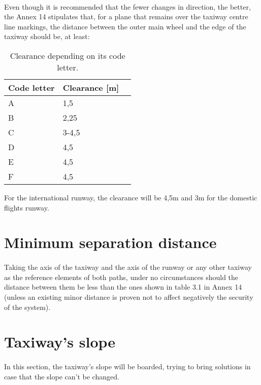 	\paragraph{}Even though it is recommended that the fewer changes in direction, the better, the Annex 14 stipulates that, for a plane that remains over the taxiway centre line markings, the distance between the outer main wheel and the edge of the taxiway should be, at least:
	
	\begin{table}[htb]
		\centering
		\begin{tabular}{ll p{5cm}}
			\toprule[2pt]
			Code letter & Clearance [m]\\
			\midrule[1pt]
			A & 1,5\\
			B & 2,25 \\
			C & 3-4,5\\
			D & 4,5\\
			E & 4,5\\
			F & 4,5\\
			\bottomrule[2pt]
		\end{tabular}
		\caption{Clearance depending on its code letter.}
		\label{}
	\end{table}

	For the international runway, the clearance will be 4,5m and 3m for the domestic flights runway.
	
	\section{Minimum separation distance}
	\paragraph{}Taking the axis of the taxiway and the axis of the runway or any other taxiway as the reference elements of both paths, under no circumstances should the distance between them be less than the ones shown in table 3.1 in Annex 14 (unless an existing minor distance is proven not to affect negatively the security of the system).
	
	\section{Taxiway's slope}
	\paragraph{}In this section, the taxiway's slope will be boarded, trying to bring solutions in case that the slope can't be changed. 
